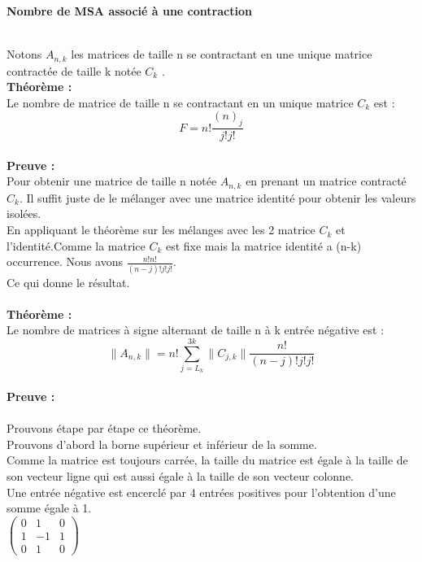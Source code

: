\documentclass{book}
\begin{document}
 \begin{large}
  \textbf{Nombre de MSA associé à une contraction}
  \end{large} \\
  Notons $A_{n,k}$ les matrices de taille n se contractant en une unique matrice contractée de taille k notée $C_k$ . \\
  \textbf{Théorème : }  \\
  Le nombre de matrice de taille n se contractant en un unique matrice $C_k$ est : \\ 
  \begin{equation}
  F= n! \frac{(n)_j}{j!j!}
  \end{equation} \\
  \textbf{Preuve : }\\
  Pour obtenir une matrice de taille n notée $A_{n,k}$ en prenant un matrice contracté $C_k$. Il suffit juste de le mélanger avec une matrice identité pour obtenir les valeurs isolées. \\
  En appliquant le théorème sur les mélanges avec les 2 matrice $C_k$ et l'identité.Comme la matrice $C_k$ est fixe mais la matrice identité a (n-k) occurrence. Nous avons  $\frac{n!n!}{(n-j)!j!j!}$. \\ Ce qui donne le résultat. \\\\
  \textbf{Théorème : }\\
  Le nombre de matrices à signe alternant de taille n à k entrée négative est :
  \begin{equation}
  \|A_{n,k}\|=n! \sum_{j=L_k}^{3k} \|C_{j,k}\| \frac{n!}{(n-j)!j!j!}
  \end{equation}\\
  \textbf{Preuve : } \\ \\
  Prouvons étape par étape ce théorème. \\ 
  Prouvons d'abord la borne supérieur et inférieur de la somme. \\
   Comme la matrice est toujours carrée, la taille du matrice est égale à la taille de son vecteur ligne qui est aussi égale à la taille de son vecteur colonne. \\
   Une entrée négative est encerclé par 4 entrées positives pour l'obtention d'une somme égale à 1. \\ 
   $\begin{pmatrix}
   0&1&0\\1&-1&1\\0&1&0
   \end{pmatrix}$\\
\end{document}
